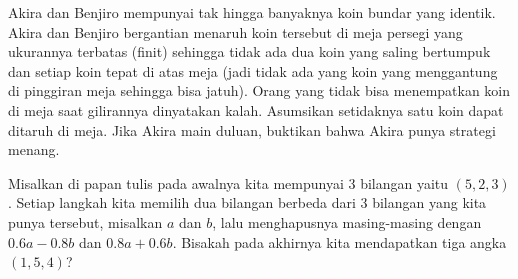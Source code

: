 \documentclass[11pt]{scrartcl}
\begin{document}
	\begin{soalbaru}
		Akira dan Benjiro mempunyai tak hingga banyaknya koin bundar yang identik. Akira dan Benjiro bergantian menaruh koin tersebut di meja persegi yang ukurannya terbatas (finit) sehingga tidak ada dua koin yang saling bertumpuk dan setiap koin tepat di atas meja (jadi tidak ada yang koin yang menggantung di pinggiran meja sehingga bisa jatuh). Orang yang tidak bisa menempatkan koin di meja saat gilirannya dinyatakan kalah. Asumsikan setidaknya satu koin dapat ditaruh di meja. Jika Akira main duluan, buktikan bahwa Akira punya strategi menang.
	\end{soalbaru}
	
	\begin{soalbaru}
		Misalkan di papan tulis pada awalnya kita mempunyai 3 bilangan yaitu $(5,2,3)$. Setiap langkah kita memilih dua bilangan berbeda dari 3 bilangan yang kita punya tersebut, misalkan $a$ dan $b$, lalu menghapusnya  masing-masing dengan $0.6a-0.8b$ dan $0.8a+0.6b$. Bisakah pada akhirnya kita mendapatkan tiga angka $(1,5,4)$?
	\end{soalbaru}
	
\end{document}
